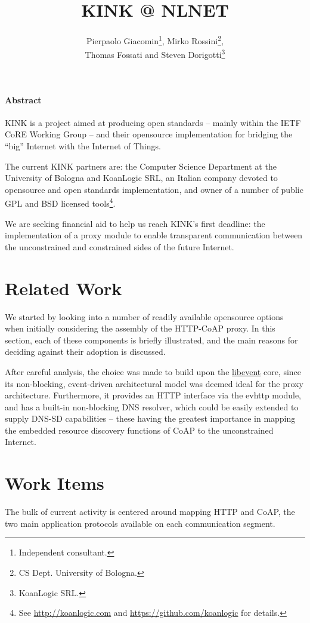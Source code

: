 \documentclass[12pt]{article}
\title{KINK @ NLNET}
\author{Pierpaolo Giacomin\footnote{Independent consultant.}, Mirko Rossini\footnote{CS Dept. University of Bologna.},\\Thomas Fossati and Steven Dorigotti\footnote{KoanLogic SRL.}}
\begin{document}
\maketitle
\tableofcontents

\paragraph{Abstract}
KINK is a project aimed at producing open standards -- mainly within the IETF CoRE Working Group -- and their \mbox{opensource} implementation for bridging the ``big'' Internet with the Internet of Things.

The current KINK partners are: the Computer Science Department at the University of Bologna and KoanLogic SRL, an Italian company devoted to \mbox{opensource} and open standards implementation, and owner of a number of public GPL and BSD licensed tools\footnote{See \href{http://koanlogic.com}{http://koanlogic.com} and \href{https://github.com/koanlogic}{https://github.com/koanlogic} for details.}.

We are seeking financial aid to help us reach KINK's first deadline: the implementation of a proxy module to enable transparent communication between the unconstrained and constrained sides of the future Internet.

\section{Related Work}
We started by looking into a number of readily available opensource options when initially considering the assembly of the HTTP-CoAP proxy.  In this section, each of these components is briefly illustrated, and the main reasons for deciding against their adoption is discussed.

After careful analysis, the choice was made to build upon the \href{http://libevent.org}{libevent} core, since its non-blocking, event-driven architectural model was deemed ideal for the proxy architecture.  Furthermore, it provides an HTTP interface via the evhttp module, and has a built-in non-blocking DNS resolver, which could be easily extended to supply DNS-SD capabilities -- these having the greatest importance in mapping the embedded resource discovery functions of CoAP to the unconstrained \mbox{Internet}.



\section{Work Items}
The bulk of current activity is centered around mapping HTTP and CoAP, the two main application protocols available on each communication segment.
\end{document}
